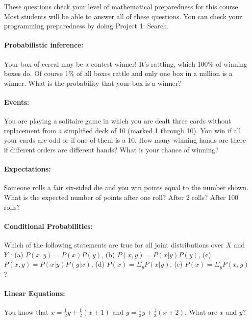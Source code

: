 \documentclass[12pt,twoside]{article}
\begin{document}


These questions check your level of mathematical preparedness for this course. Most students will be able to answer all of these questions. You can check your programming preparedness by doing Project 1: Search. 



\paragraph{Probabilistic inference:} Your box of cereal may be a contest winner! It’s rattling, which 100\% of winning boxes do. Of course 1\% of all boxes rattle and only one box in a million is a winner. What is the probability that your box is a winner?

\vspace{4cm}


\paragraph{Events:} You are playing a solitaire game in which you are dealt three cards without replacement from a simplified deck of 10 (marked 1 through 10). You win if all your cards are odd or if one of them is a 10. How many winning hands are there if different orders are different hands? What is your chance of winning?

\vspace{4cm}

\paragraph{Expectations:} Someone rolls a fair six-sided die and you win points equal to the number shown. What is the expected number of points after one roll? After 2 rolls? After 100 rolls?

\clearpage

\paragraph{Conditional Probabilities:} Which of the following statements are true for all joint distributions over $X$ and $Y$ : (a) $P(x, y) = P(x)P(y)$, (b) $P(x, y) = P(x|y)P(y)$, (c) $P(x, y) = P(x|y)P(y|x)$, (d) $P(x) = \Sigma_y P(x|y)$, (e) $P(x) = \Sigma_y P(x, y)$?

\vspace{4cm}

\paragraph{Linear Equations:} You know that $x=\frac{1}{2}y+\frac{1}{2}(x+1)$ and $y=\frac{1}{3}y+\frac{1}{3}(x+2)$. What are $x$ and $y$?
\end{document}
